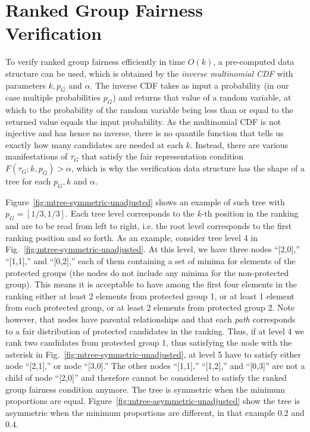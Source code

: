 
\section{Ranked Group Fairness Verification}
\label{sec:fairness-verification}
To verify ranked group fairness efficiently in time $O(k)$, a pre-computed data structure can be used, which is obtained by the \emph{inverse multinomial CDF} with parameters $k, p_G$ and $ \alpha $.
%
The inverse CDF takes as input a probability (in our case multiple probabilities $p_G$) and returns that value of a random variable, at which to the probability of the random variable being less than or equal to the returned value equals the input probability.
%
As the multinomial CDF is not injective and has hence no inverse, there is no quantile function that tells us exactly how many candidates are needed at each $ k $.
%
Instead, there are various manifestations of $ \tau_G $ that satisfy the fair representation condition $F(\tau_G;k,p_G) > \alpha$, which is why the verification data structure has the shape of a tree for each $ p_G, k $ and $ \alpha $.
%

Figure~\ref{fig:mtree-symmetric-unadjusted} shows an example of such tree with $p_G = [1/3, 1/3]$. 
%
Each tree level corresponds to the $k$-th position in the ranking and are to be read from left to right, i.e. the root level corresponds to the first ranking position and so forth.
%
As an example, consider tree level 4 in Fig.~\ref{fig:mtree-symmetric-unadjusted}.
%
At this level, we have three nodes ``[2,0],'' ``[1,1],'' and ``[0,2],'' each of them containing a set of minima for elements of the protected groups (the nodes do not include any minima for the non-protected group).
%
This means it is acceptable to have among the first four elements in the ranking either at least 2 elements from protected group 1, or at least 1 element from each protected group, or at least 2 elements from protected group 2.
%
Note however, that nodes have parental relationships and that each \emph{path} corresponds to a fair distribution of protected candidates in the ranking.
%
Thus, if at level 4 we rank two candidates from protected group 1, thus satisfying the node with the asterisk in Fig.~\ref{fig:mtree-symmetric-unadjusted}, at level 5 have to satisfy either node ``[2,1],'' or node ``[3,0].''
%
The other nodes ``[1,1],'' ``[1,2],'' and ``[0,3]'' are not a child of node ``[2,0]'' and therefore cannot be considered to satisfy the ranked group fairness condition anymore.
%
The tree is symmetric when the minimum proportions are equal. 
%
Figure~\ref{fig:mtree-asymmetric-unadjusted} show the tree is asymmetric when the minimum proportions are different, in that example $0.2$ and $0.4$.

